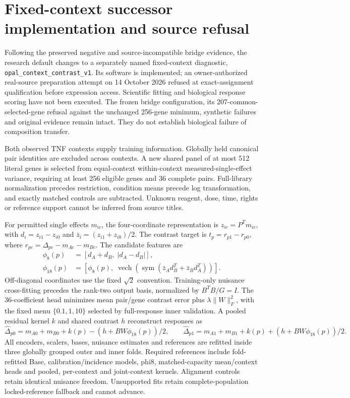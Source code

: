 \section{Fixed-context successor implementation and source refusal}

Following the preserved negative and source-incompatible bridge evidence, the research default changes to a separately named fixed-context diagnostic, \texttt{opal\_context\_contrast\_v1}. Its software is implemented; an owner-authorized real-source preparation attempt on 14 October 2026 refused at exact-assignment qualification before expression access. Scientific fitting and biological response scoring have not been executed. The frozen bridge configuration, its 207-common-selected-gene refusal against the unchanged 256-gene minimum, synthetic failures and original evidence remain intact. They do not establish biological failure of composition transfer.

Both observed TNF contexts supply training information. Globally held canonical pair identities are excluded across contexts. A new shared panel of at most 512 literal genes is selected from equal-context within-context measured-single-effect variance, requiring at least 256 eligible genes and 36 complete pairs. Full-library normalization precedes restriction, condition means precede log transformation, and exactly matched controls are subtracted. Unknown reagent, dose, time, rights or reference support cannot be inferred from source titles.

For permitted single effects $m_{ic}$, the four-coordinate representation is $z_{ic}=P^T m_{ic}$, with $d_i=z_{i1}-z_{i0}$ and $\bar z_i=(z_{i1}+z_{i0})/2$. The contrast target is $t_p=r_{p1}-r_{p0}$, where $r_{pc}=\Delta_{pc}-m_{Ac}-m_{Bc}$. The candidate features are
\begin{align}
\phi_8(p)&=[d_A+d_B,\;|d_A-d_B|],\\
\phi_{18}(p)&=[\phi_8(p),\;\operatorname{vech}(\operatorname{sym}(\bar z_A d_B^T+\bar z_B d_A^T))].
\end{align}
Off-diagonal coordinates use the fixed $\sqrt{2}$ convention. Training-only nuisance cross-fitting precedes the rank-two output basis, normalized by $B^TB/G=I$. The 36-coefficient head minimizes mean pair/gene contrast error plus $\lambda\lVert W\rVert_F^2$, with the fixed menu $\{0.1,1,10\}$ selected by full-response inner validation. A pooled residual kernel $k$ and shared contrast $h$ reconstruct responses as
\begin{equation}
\widehat\Delta_{p0}=m_{A0}+m_{B0}+k(p)-(h+BW\phi_{18}(p))/2,\qquad
\widehat\Delta_{p1}=m_{A1}+m_{B1}+k(p)+(h+BW\phi_{18}(p))/2.
\end{equation}
All encoders, scalers, bases, nuisance estimates and references are refitted inside three globally grouped outer and inner folds. Required references include fold-refitted Base, calibration/incidence models, phi8, matched-capacity mean/context heads and pooled, per-context and joint-context kernels. Alignment controls retain identical nuisance freedom. Unsupported fits retain complete-population locked-reference fallback and cannot advance.

